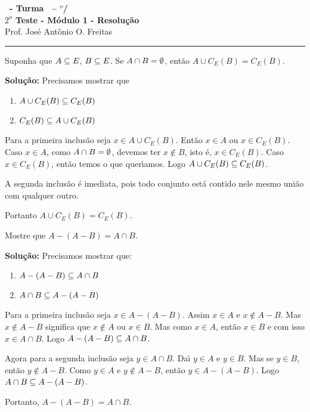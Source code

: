\documentclass[12pt]{exam}
\begin{document}
\begin{center}
{\Large\bf \disciplina\ - Turma \turma\ -- \semestre$^{o}$/\ano} \\ \vspace{9pt} {\large\bf
$2^{\underline{o}}$ Teste - M\'odulo 1 - Resolu\c{c}\~ao}\\
\vspace{9pt} Prof. Jos{\'e} Ant{\^o}nio O. Freitas
\end{center}
\hrule

\vspace{.6cm}

\questao Suponha que $A \subseteq E$, $B \subseteq E$. Se $A \cap B = \emptyset$, ent\~ao $A \cup C_E(B) = C_E(B)$.

\noindent\textbf{Solu\c{c}\~ao:} Precisamos mostrar que
\begin{enumerate}[label={\roman*})]
    \item $A \cup C_E(B) \subseteq C_E(B)$
    \item $C_E(B) \subseteq A \cup C_E(B)$
\end{enumerate}

Para a primeira inclus\~ao seja $x \in A \cup C_E(B)$. Ent\~ao $x \in A$ ou $x \in C_E(B)$. Caso $x \in A$, como $A \cap B = \emptyset$, devemos ter $x \notin B$, isto \'e, $x \in C_E(B)$. Caso $x \in C_E(B)$, ent\~ao temos o que quer{\'\i}amos. Logo $A \cup C_E(B) \subseteq C_E(B)$.

A segunda inclus\~ao \'e imediata, pois todo conjunto est\'a contido nele mesmo uni\~ao com qualquer outro.

Portanto $A \cup C_E(B) = C_E(B)$.

\vspace{.5cm}

\questao Mostre que $A - (A - B) = A \cap B$.

\noindent\textbf{Solu\c{c}\~ao:} Precisamos mostrar que:
\begin{enumerate}[label={\roman*})]
    \item $A - (A - B) \subseteq A \cap B$
    \item $A \cap B \subseteq A - (A - B)$
\end{enumerate}

Para a primeira inclus\~ao seja $x \in A - (A - B)$. Assim $x \in A$ e $x \notin A - B$. Mas $x \notin A - B$ significa que $x \notin A$ ou $x \in B$. Mas como $x \in A$, ent\~ao $x \in B$ e com isso $x \in A \cap B$. Logo $A - (A - B) \subseteq A \cap B$.

Agora para a segunda inclus\~ao seja $y \in A \cap B$. Da{\'\i} $y \in A$ e $y \in B$. Mas se $y \in B$, ent\~ao $y \notin A - B$. Como $y \in A$ e $y \notin A - B$, ent\~ao $y \in A - (A - B)$. Logo $A \cap B \subseteq A - (A - B)$.

Portanto, $A - (A - B) = A \cap B$.
\end{document}
